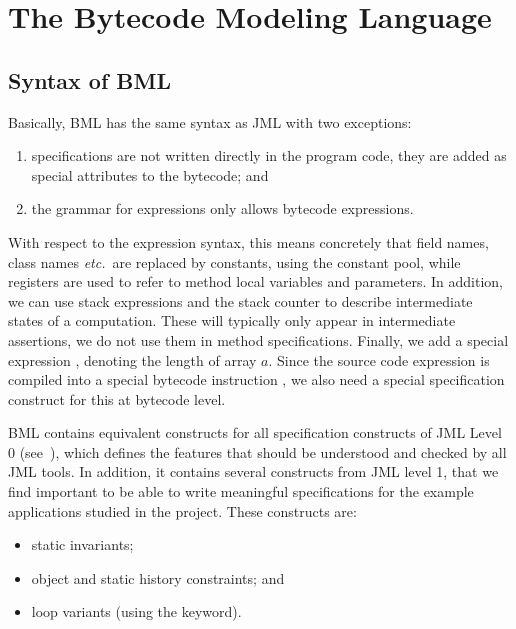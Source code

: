 \section{The Bytecode Modeling Language}
\label{SecBML}


\subsection{Syntax of BML}

Basically, BML has the same syntax as JML with two exceptions:
\begin{enumerate}
\item specifications are not written directly in the program code,
they are added as special attributes to the bytecode; and
\item the grammar for expressions only allows bytecode expressions.
\end{enumerate}

With respect to the expression syntax, this means concretely that
field names, class names \emph{etc.}\ are replaced by constants, using
the constant pool, while registers are used to refer to method local
variables and parameters. In addition, we can use stack expressions and
 the stack counter to describe intermediate states of a computation.
 These will typically only appear in intermediate assertions, we do not use them
in method specifications. Finally, we add a special expression
, denoting the length of array \(a\). Since the 
source code expression  is compiled into a
special bytecode instruction , we also need a
special specification construct for this at bytecode level.

BML contains equivalent constructs for all specification constructs of
JML Level 0 (see~\cite[\S2.9]{JMLReferenceManual05}), which defines
the features that should be understood and checked by all JML
tools. In addition, it contains several constructs from JML level 1,
that we find important to be able to write meaningful specifications
for the example applications studied in the \mobius project. These
constructs are:
\begin{itemize}
\item static invariants;
\item object and static history constraints; and 
\item loop variants (using the  keyword).
\end{itemize}

